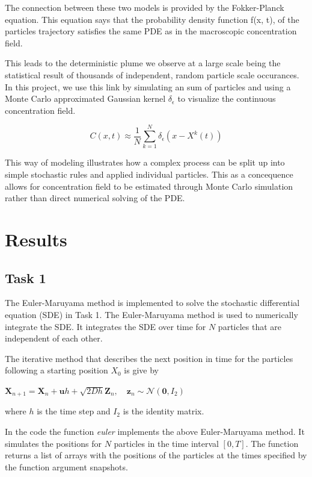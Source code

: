 \documentclass[11pt]{article}
\begin{document}
The connection between these two models is provided by the Fokker-Planck
equation. This equation says that the probability density function f(x,
t), of the particles trajectory satisfies the same PDE as in the
macroscopic concentration field.

This leads to the deterministic plume we observe at a large scale being
the statistical result of thousands of independent, random particle
scale occurances. In this project, we use this link by simulating an sum
of particles and using a Monte Carlo approximated Gaussian kernel
\(\delta_{\epsilon}\) to visualize the continuous concentration field.

\[C(x, t) \approx \frac{1}{N} \sum_{k=1}^{N} \delta_{\epsilon}(x - X^{k}(t))\]

This way of modeling illustrates how a complex process can be split up
into simple stochastic rules and applied individual particles. This as a
concequence allows for concentration field to be estimated through Monte
Carlo simulation rather than direct numerical solving of the PDE.

    \section{Results}\label{results}

\subsection{Task 1}\label{task-1}


The Euler-Maruyama method is implemented to solve the stochastic
differential equation (SDE) in Task 1. The Euler-Maruyama method is used
to numerically integrate the SDE. It integrates the SDE over time for
\(N\) particles that are independent of each other.

The iterative method that describes the next position in time for the
particles following a starting position \(X_0\) is give by

\(\mathbf{X}_{n+1} = \mathbf{X}_n + \mathbf{u}h + \sqrt{2Dh}\mathbf{Z}_n, \quad \mathbf{z}_n \sim \mathcal{N}(\mathbf{0}, I_2)\)

where \(h\) is the time step and \(I_2\) is the identity matrix.

In the code the function \emph{euler} implements the above
Euler-Maruyama method. It simulates the positions for \(N\) particles in
the time interval \([0, T]\). The function returns a list of arrays with
the positions of the particles at the times specified by the function
argument snapshots.
\end{document}

